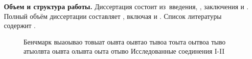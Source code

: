 \textbf{Объем и структура работы.} Диссертация состоит из~введения,
,
заключения и
.
%
Полный объём диссертации составляет
, включая
 и
.
Список литературы содержит
.

\begin{landscape}
\begin{figure}[ht]
\label{spektr}
\caption{ Бенчмарк выаоывао товыат оывта оывтао тывоа тоыта оытвоа тыво атыолвта оывта олывта оыта отыво 
Исследованные соединения I-II}
\end{figure}
\end{landscape}